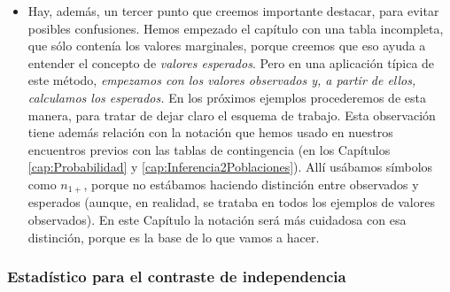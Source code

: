 \begin{itemize}
    \item Hay, además, un tercer punto que creemos importante destacar, para evitar posibles confusiones. Hemos empezado el capítulo con una tabla incompleta, que sólo contenía los valores marginales, porque creemos que eso ayuda a entender el concepto de {\em valores esperados}. Pero en una aplicación típica de este método, {\em empezamos con los valores observados y, a partir de ellos, calculamos los esperados.} En los próximos ejemplos procederemos de esta manera, para tratar de dejar claro el esquema de trabajo. Esta observación tiene además relación con la notación que hemos usado en nuestros encuentros previos con las tablas de contingencia (en los Capítulos \ref{cap:Probabilidad} y \ref{cap:Inferencia2Poblaciones}). Allí usábamos símbolos como $n_{1+}$, porque no estábamos haciendo distinción entre observados y esperados (aunque, en realidad, se trataba en todos los ejemplos de valores observados). En este Capítulo la notación será más cuidadosa con esa distinción, porque es la base de lo que vamos a hacer.
\end{itemize}

\subsubsection{Estadístico para el contraste de independencia}
\label{cap12:subsubsec:ContrasteHipotesisIndependencia}

